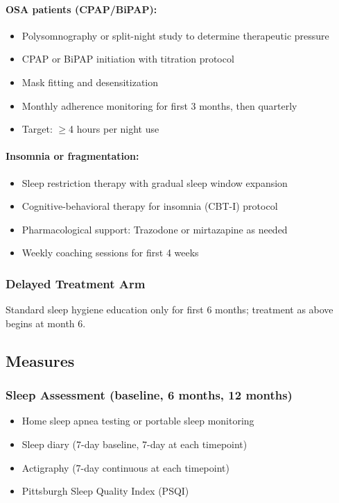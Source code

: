 \paragraph{OSA patients (CPAP/BiPAP):}
\begin{itemize}
    \item Polysomnography or split-night study to determine therapeutic pressure
    \item CPAP or BiPAP initiation with titration protocol
    \item Mask fitting and desensitization
    \item Monthly adherence monitoring for first 3 months, then quarterly
    \item Target: $\geq$4 hours per night use
\end{itemize}

\paragraph{Insomnia or fragmentation:}
\begin{itemize}
    \item Sleep restriction therapy with gradual sleep window expansion
    \item Cognitive-behavioral therapy for insomnia (CBT-I) protocol
    \item Pharmacological support: Trazodone or mirtazapine as needed
    \item Weekly coaching sessions for first 4 weeks
\end{itemize}

\subsubsection{Delayed Treatment Arm}
Standard sleep hygiene education only for first 6 months; treatment as above begins at month 6.

\subsection{Measures}

\subsubsection{Sleep Assessment (baseline, 6 months, 12 months)}
\begin{itemize}
    \item Home sleep apnea testing or portable sleep monitoring
    \item Sleep diary (7-day baseline, 7-day at each timepoint)
    \item Actigraphy (7-day continuous at each timepoint)
    \item Pittsburgh Sleep Quality Index (PSQI)
\end{itemize}


